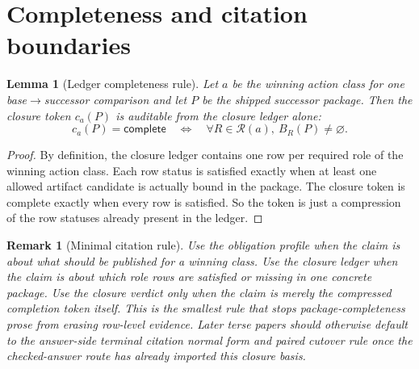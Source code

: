 \documentclass[11pt]{article}
\newtheorem{lemma}{Lemma}
\newtheorem{remark}{Remark}
\begin{document}
\section{Completeness and citation boundaries}

\begin{lemma}[Ledger completeness rule]
Let $a$ be the winning action class for one base$\to$successor comparison and let $P$ be the shipped successor package.
Then the closure token $c_a(P)$ is auditable from the closure ledger alone:
\[
c_a(P)=\textsf{complete}
\quad\Longleftrightarrow\quad
\forall R\in\mathcal R(a),\ B_R(P)\neq\varnothing.
\]
\end{lemma}

\begin{proof}
By definition, the closure ledger contains one row per required role of the winning action class.
Each row status is \textsf{satisfied} exactly when at least one allowed artifact candidate is actually bound in the package.
The closure token is \textsf{complete} exactly when every row is satisfied.
So the token is just a compression of the row statuses already present in the ledger.
\end{proof}

\begin{remark}[Minimal citation rule]
Use the obligation profile when the claim is about \emph{what should be published} for a winning class.
Use the closure ledger when the claim is about \emph{which role rows are satisfied or missing} in one concrete package.
Use the closure verdict only when the claim is merely the compressed completion token itself.
This is the smallest rule that stops package-completeness prose from erasing row-level evidence. Later terse papers should otherwise default to the answer-side terminal citation normal form and paired cutover rule once the checked-answer route has already imported this closure basis.\cite{series:challengeanswerreviewmenus,series:pairedterminalcitationdiscipline,series:pairedterminalcutoverrules}
\end{remark}
\end{document}
